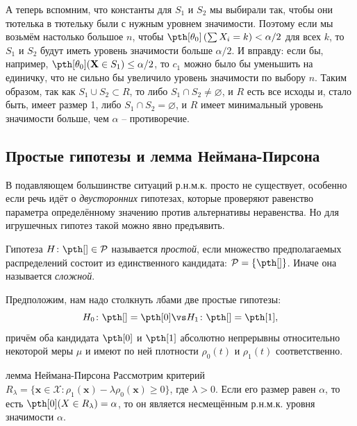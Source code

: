{\begin{example}
А теперь вспомним, что константы для $S_1$ и $S_2$ мы выбирали так, чтобы они тютелька в тютельку были с нужным уровнем значимости. Поэтому если мы возьмём настолько большое $n$, чтобы $\pth[\theta_0]\left(\sum X_i = k\right) < \alpha / 2$ для всех $k$, то $S_1$ и $S_2$ будут иметь уровень значимости больше $\alpha / 2$. И вправду: если бы, например, $\pth[\theta_0](\mathbf X \in S_1) \le \alpha / 2$, то $c_1$ можно было бы уменьшить на единичку, что не сильно бы увеличило уровень значимости по выбору $n$. Таким образом, так как $S_1 \cup S_2 \subset R$, то либо $S_1 \cap S_2 \ne \varnothing$, и $R$ есть все исходы и, стало быть, имеет размер 1, либо $S_1 \cap S_2 = \varnothing$, и $R$ имеет минимальный уровень значимости больше, чем $\alpha$ -- противоречие.
\end{example}
}

\subsection{Простые гипотезы и лемма Неймана-Пирсона}

В подавляющем большинстве ситуаций р.н.м.к. просто не существует, особенно если речь идёт о \textit{двусторонних} гипотезах, которые проверяют равенство параметра определённому значению против альтернативы неравенства. Но для игрушечных гипотез такой можно явно предъявить.

\begin{definition}
Гипотеза $H\colon \pth[] \in \mathcal{P}$ называется \textit{простой}, если множество предполагаемых распределений состоит из единственного кандидата: $\mathcal{P} = \{\pth[]\}$. Иначе она называется \textit{сложной}.
\end{definition}

Предположим, нам надо столкнуть лбами две простые гипотезы:
\[
H_0\colon \pth[] = \pth[0] \vs H_1\colon \pth[] = \pth[1],
\]
причём оба кандидата $\pth[0]$ и  $\pth[1]$ абсолютно непрерывны относительно некоторой меры $\mu$ и имеют по ней плотности $\rho_0(t)$ и $\rho_1(t)$ соответственно.

\begin{theorem}{лемма Неймана-Пирсона}{}
Рассмотрим критерий $R_{\lambda} = \{\mathbf x\in \mathcal{X}\colon \rho_1(\mathbf x) - \lambda \rho_0(\mathbf x) \ge 0\}$, где $\lambda > 0$. Если его размер равен $\alpha$, то есть $\pth[0](X \in R_{\lambda}) = \alpha$, то он является несмещённым р.н.м.к. уровня значимости $\alpha$.
\end{theorem}

